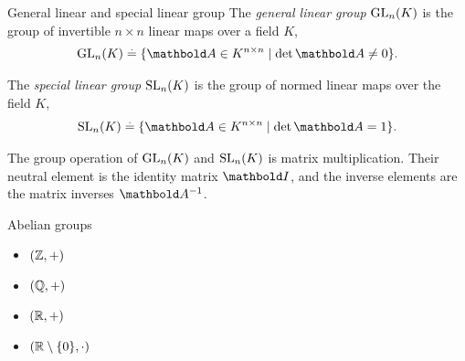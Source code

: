 \begin{ex}{General linear and special linear group}{}
The \emph{general linear group} $\mathrm{GL}_{n}(K)$ is the group of invertible ${n \times n}$ linear maps over a field $K$, \begin{align}
    \GL{n}{K} \defeq \{\mA \in K^{n \times n} \mid \det{\mA} \neq 0\}.
\end{align}

The \emph{special linear group} $\mathrm{SL}_{n}(K)$ is the group of normed linear maps over the field $K$, \begin{align}
    \SL{n}{K} \defeq \{\mA \in K^{n \times n} \mid \det{\mA} = 1\}.
\end{align}

The group operation of $\mathrm{GL}_{n}(K)$ and $\mathrm{SL}_{n}(K)$ is matrix multiplication. Their neutral element is the identity matrix $\mI$, and the inverse elements are the matrix inverses $\inv{\mA}$.
\end{ex}

\begin{ex}{Abelian groups}{}
\begin{itemize}
    \item $(\mathbb{Z},+)$
    \item $(\mathbb{Q},+)$
    \item $(\mathbb{R},+)$
    \item $(\mathbb{R} \setminus \{0\},\cdot)$
\end{itemize}
\end{ex}

